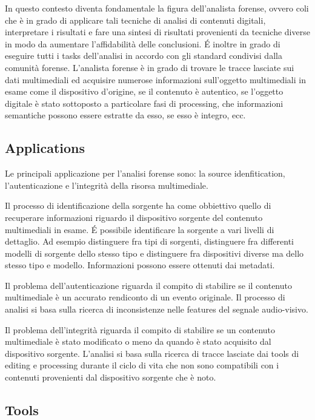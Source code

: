 In questo contesto diventa fondamentale la figura dell'analista forense, ovvero coli che è in grado di applicare tali tecniche di analisi di contenuti digitali, interpretare i risultati e fare una sintesi di risultati provenienti da tecniche diverse in modo da aumentare l'affidabilità delle conclusioni. É inoltre in grado di eseguire tutti i tasks dell'analisi in accordo con gli standard condivisi dalla comunità forense.
L'analista forense è in grado di trovare le tracce lasciate sui dati multimediali ed acquisire numerose informazioni sull'oggetto multimediali in esame come il dispositivo d'origine, se il contenuto è autentico, se l'oggetto digitale è stato sottoposto a particolare fasi di processing, che informazioni semantiche possono essere estratte da esso, se esso è integro, ecc.

\subsection{Applications}

Le principali applicazione per l'analisi forense sono: la source idenfitication, l'autenticazione e l'integrità della risorsa multimediale.

Il processo di identificazione della sorgente ha come obbiettivo quello di recuperare informazioni riguardo il dispositivo sorgente del contenuto multimediali in esame. É possibile identificare la sorgente a vari livelli di dettaglio. Ad esempio distinguere fra tipi di sorgenti, distinguere fra differenti modelli di sorgente dello stesso tipo e distinguere fra dispositivi diverse ma dello stesso tipo e modello. Informazioni possono essere ottenuti dai metadati.

Il problema dell'autenticazione riguarda il compito di stabilire se il contenuto multimediale è un accurato rendiconto di un evento originale. Il processo di analisi si basa sulla ricerca di inconsistenze nelle features del segnale audio-visivo.

Il problema dell'integrità riguarda il compito di stabilire se un contenuto multimediale è stato modificato o meno da quando è stato acquisito dal dispositivo sorgente. L'analisi si basa sulla ricerca di tracce lasciate dai tools di editing e processing durante il ciclo di vita che non sono compatibili con i contenuti provenienti dal dispositivo sorgente che è noto.

\subsection{Tools}

